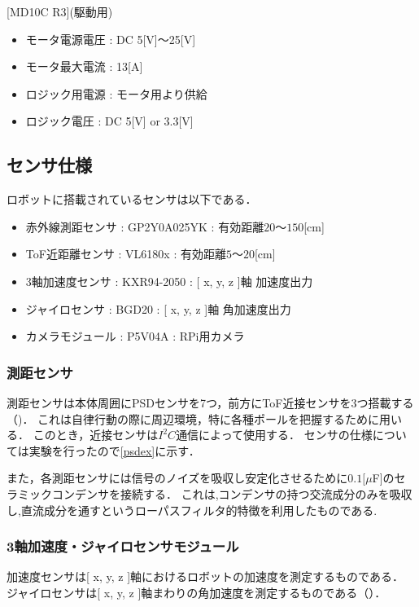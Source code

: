 \documentclass[11pt,a4]{jsarticle}
\begin{document}
    [MD10C R3](駆動用)
    \begin{itemize}
     \item モータ電源電圧 : DC 5[V]$〜$25[V]
     \item モータ最大電流 : 13[A]
     \item ロジック用電源 : モータ用より供給
     \item ロジック電圧   : DC 5[V] or 3.3[V]
    \end{itemize}


  \subsection{センサ仕様}
    ロボットに搭載されているセンサは以下である．
    \begin{itemize}
     \item 赤外線測距センサ : GP2Y0A025YK : 有効距離$20 〜 150$[cm]
     \item ToF近距離センサ : VL6180x    : 有効距離$5 〜 20$[cm]
     \item 3軸加速度センサ : KXR94-2050 : [ x, y, z ]軸 加速度出力
     \item ジャイロセンサ : BGD20 : [ x, y, z ]軸 角加速度出力
     \item カメラモジュール : P5V04A : RPi用カメラ
    \end{itemize}

    \subsubsection{測距センサ}
      測距センサは本体周囲にPSDセンサを7つ，前方にToF近接センサを3つ搭載する（)．
      これは自律行動の際に周辺環境，特に各種ポールを把握するために用いる．
      このとき，近接センサは$I^2 C$通信によって使用する．
      センサの仕様については実験を行ったので\ref{psdex}に示す．

      また，各測距センサには信号のノイズを吸収し安定化させるために$0.1[\mu $F]のセラミックコンデンサを接続する．
      これは,コンデンサの持つ交流成分のみを吸収し,直流成分を通すというローパスフィルタ的特徴を利用したものである.


    \subsubsection{3軸加速度・ジャイロセンサモジュール}
      加速度センサは[ x, y, z ]軸におけるロボットの加速度を測定するものである．
      ジャイロセンサは[ x, y, z ]軸まわりの角加速度を測定するものである（）．
\end{document}
